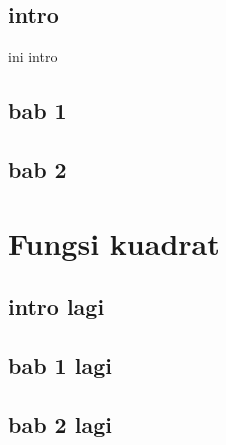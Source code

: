 \documentclass[11pt]{article}
\begin{document}
	\subsection{intro}
	ini intro
	\subsection{bab 1}
	\subsection{bab 2}
\section{Fungsi kuadrat}
	\subsection{intro lagi}
	\subsection{bab 1 lagi}
	\subsection{bab 2 lagi}
\end{document}
